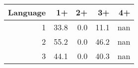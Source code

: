 \begin{tabular}{rrrrr}
\toprule
   Language &   1+ &   2+ &   3+ &   4+ \\
\midrule
          1 & \num{33.8} &  \num{0.0} & \num{11.1} &  nan \\
          2 & \num{55.2} &  \num{0.0} & \num{46.2} &  nan \\
          3 & \num{44.1} &  \num{0.0} & \num{40.3} &  nan \\
\bottomrule
\end{tabular}